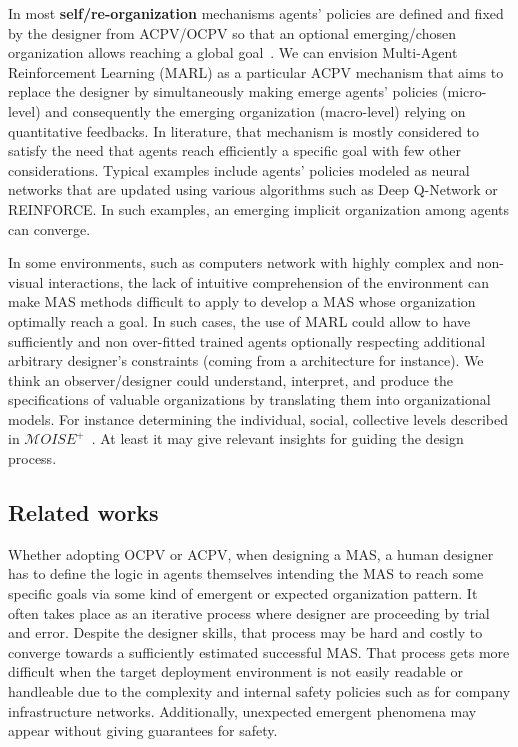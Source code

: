 \documentclass{ecai}
\begin{document}
In most \textbf{self/re-organization} mechanisms agents' policies are defined and fixed by the designer from ACPV/OCPV so that an optional emerging/chosen organization allows reaching a global goal~\citep{Picard2009}. We can envision Multi-Agent Reinforcement Learning (MARL) as a particular ACPV mechanism that aims to replace the designer by simultaneously making emerge agents' policies (micro-level) and consequently the emerging organization (macro-level) relying on quantitative feedbacks. In literature, that mechanism is mostly considered to satisfy the need that agents reach efficiently a specific goal with few other considerations. Typical examples include agents' policies modeled as neural networks that are updated using various algorithms such as Deep Q-Network or REINFORCE. In such examples, an emerging implicit organization among agents can converge.

In some environments, such as computers network with highly complex and non-visual interactions, the lack of intuitive comprehension of the environment can make MAS methods difficult to apply to develop a MAS whose organization optimally reach a goal. In such cases, the use of MARL could allow to have sufficiently and non over-fitted trained agents optionally respecting additional arbitrary designer's constraints (coming from a architecture for instance). We think an observer/designer could understand, interpret, and produce the specifications of valuable organizations by translating them into organizational models. For instance determining the individual, social, collective levels described in $\mathcal{M}OISE^{+}$~\citep{Hubner2002}. At least it may give relevant insights for guiding the design process.

\subsection{Related works}

Whether adopting OCPV or ACPV, when designing a MAS, a human designer has to define the logic in agents themselves intending the MAS to reach some specific goals via some kind of emergent or expected organization pattern. It often takes place as an iterative process where designer are proceeding by trial and error. Despite the designer skills, that process may be hard and costly to converge towards a sufficiently estimated successful MAS. That process gets more difficult when the target deployment environment is not easily readable or handleable due to the complexity and internal safety policies such as for company infrastructure networks. Additionally, unexpected emergent phenomena may appear without giving guarantees for safety.
\end{document}
